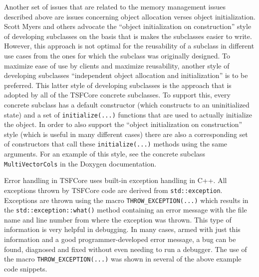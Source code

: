 Another set of issues that are related to the memory management issues
described above are issues concerning object allocation verses object
initialization.  Scott Myers \cite{ref:meyers_1996} and others
advocate the ``object initialization on construction'' style of
developing subclasses on the basis that is makes the subclasses easier
to write.  However, this approach is not optimal for the reusability of
a subclass in different use cases from the ones for which the subclass
was originally designed.  To maximize ease of use by clients and
maximize reusability, another style of developing subclasses
``independent object allocation and initialization'' is to be
preferred.  This latter style of developing subclasses is the approach
that is adopted by all of the TSFCore concrete subclasses.  To support
this, every concrete subclass has a default constructor (which
constructs to an uninitialized state) and a set of
\texttt{initialize(...)}  functions that are used to actually
initialize the object.  In order to also support the ``object
initialization on construction'' style (which is useful in many
different cases) there are also a corresponding set of constructors
that call these \texttt{initialize(...)} methods using the same
arguments.  For an example of this style, see the concrete subclass
\texttt{MultiVectorCols} in the Doxygen documentation.

Error handling in TSFCore uses built-in exception handling in C++.
All exceptions thrown by TSFCore code are derived from
\texttt{std::exception}.  Exceptions are thrown using the macro
\texttt{THROW\_EXCEPTION(...)} which results in the \texttt{std::exception::what()}
method containing an error message with the file name and line number
from where the exception was thrown.  This type of information is very
helpful in debugging.  In many cases, armed with just this information
and a good programmer-developed error message, a bug can be found,
diagnosed and fixed without even needing to run a debugger.  The use
of the macro \texttt{THROW\_EXCEPTION(...)} was shown in several of
the above example code snippets.

